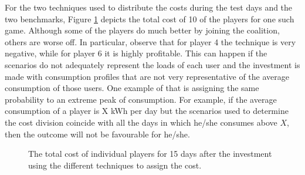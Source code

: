 \documentclass[sigconf, table]{acmart}
\begin{document}
For the two techniques used to distribute the costs during the test days and the two benchmarks, Figure \ref{fig:performance1} depicts the total cost of 10 of the players for one such game. Although some of the players do much better by joining the coalition, others are worse off.
In particular, observe that for player 4 the technique is very negative, while for player 6 it is highly profitable. This can happen if the scenarios do not adequately represent the loads of each user and the investment is made with consumption profiles that are not very representative of the average consumption of those users. One example of that is assigning the same probability to an extreme peak of consumption.  For example, if the average consumption of a player is X kWh per day but the scenarios used to determine the cost division coincide with all the days in which he/she consumes above $X$, then the outcome will not be favourable for he/she.
\begin{figure}[h]


  \caption{The total cost of individual players for 15 days after the investment using the different techniques to assign the cost.}
  \label{fig:performance1}
\end{figure}
\end{document}
